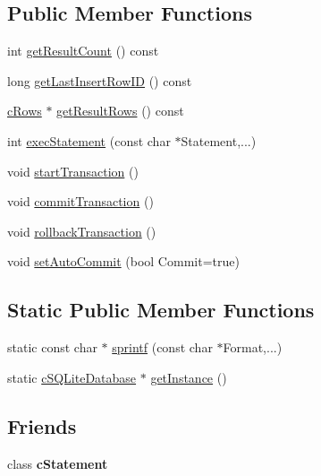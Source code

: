 \subsection*{Public Member Functions}
\begin{CompactItemize}
\item 
int \hyperlink{classcSQLiteDatabase_2119fbbf7a02c9c627038ddc14c9eb48}{getResultCount} () const 
\item 
long \hyperlink{classcSQLiteDatabase_408e5de345a74f2540ee1cea3c97cd51}{getLastInsertRowID} () const 
\item 
\hyperlink{classcRows}{cRows} $\ast$ \hyperlink{classcSQLiteDatabase_4cd24d9d63173c54b63aadc7ada86e7e}{getResultRows} () const 
\item 
int \hyperlink{classcSQLiteDatabase_33ac864ee86fe3f08f66f1c14fcfc331}{execStatement} (const char $\ast$Statement,...)
\item 
void \hyperlink{classcSQLiteDatabase_5c481c06d73cff4f1192409bfc23a15a}{startTransaction} ()
\item 
void \hyperlink{classcSQLiteDatabase_f11b7090ae824f7f3fc094dc7112323a}{commitTransaction} ()
\item 
void \hyperlink{classcSQLiteDatabase_e20eff598832e1da41a8e915ee807548}{rollbackTransaction} ()
\item 
void \hyperlink{classcSQLiteDatabase_b1749baadeb733ea3efdbbd9ffe83253}{setAutoCommit} (bool Commit=true)
\end{CompactItemize}
\subsection*{Static Public Member Functions}
\begin{CompactItemize}
\item 
static const char $\ast$ \hyperlink{classcSQLiteDatabase_cdc42326657aea81fd26da6500642381}{sprintf} (const char $\ast$Format,...)
\item 
static \hyperlink{classcSQLiteDatabase}{cSQLiteDatabase} $\ast$ \hyperlink{classcSQLiteDatabase_a39756509bd68fd8e335cc9cc40c6f26}{getInstance} ()
\end{CompactItemize}
\subsection*{Friends}
\begin{CompactItemize}
\item 
\hypertarget{classcSQLiteDatabase_e652fe93205a32a144bf764782bea797}{
class \textbf{cStatement}}
\label{classcSQLiteDatabase_e652fe93205a32a144bf764782bea797}

\end{CompactItemize}


